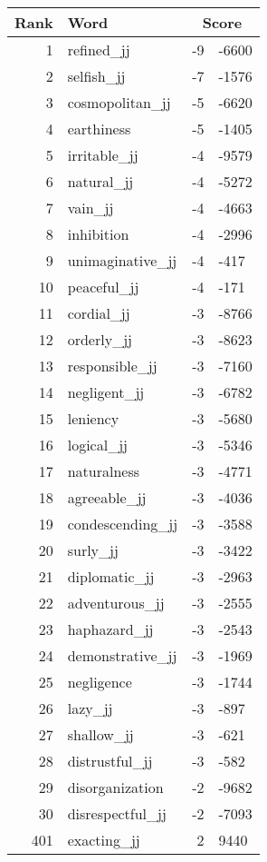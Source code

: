 \begin{longtable}[!htbp]{| rlr@{.}l |}
    \hline
    \textbf{Rank} & \textbf{Word} & \multicolumn{2}{c|}{\textbf{Score}} \\
    \hline
    \endhead
    1 & refined\_jj & -9 & -6600 \\
    2 & selfish\_jj & -7 & -1576 \\
    3 & cosmopolitan\_jj & -5 & -6620 \\
    4 & earthiness & -5 & -1405 \\
    5 & irritable\_jj & -4 & -9579 \\
    6 & natural\_jj & -4 & -5272 \\
    7 & vain\_jj & -4 & -4663 \\
    8 & inhibition & -4 & -2996 \\
    9 & unimaginative\_jj & -4 & -417 \\
    10 & peaceful\_jj & -4 & -171 \\
    11 & cordial\_jj & -3 & -8766 \\
    12 & orderly\_jj & -3 & -8623 \\
    13 & responsible\_jj & -3 & -7160 \\
    14 & negligent\_jj & -3 & -6782 \\
    15 & leniency & -3 & -5680 \\
    16 & logical\_jj & -3 & -5346 \\
    17 & naturalness & -3 & -4771 \\
    18 & agreeable\_jj & -3 & -4036 \\
    19 & condescending\_jj & -3 & -3588 \\
    20 & surly\_jj & -3 & -3422 \\
    21 & diplomatic\_jj & -3 & -2963 \\
    22 & adventurous\_jj & -3 & -2555 \\
    23 & haphazard\_jj & -3 & -2543 \\
    24 & demonstrative\_jj & -3 & -1969 \\
    25 & negligence & -3 & -1744 \\
    26 & lazy\_jj & -3 & -897 \\
    27 & shallow\_jj & -3 & -621 \\
    28 & distrustful\_jj & -3 & -582 \\
    29 & disorganization & -2 & -9682 \\
    30 & disrespectful\_jj & -2 & -7093 \\
    401 & exacting\_jj & 2 & 9440 \\

\end{longtable}
